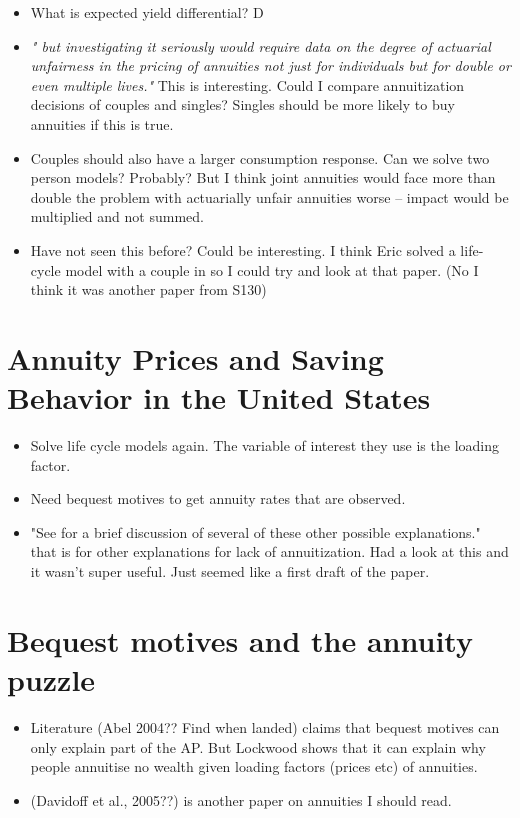 \documentclass[12pt]{article}
\begin{document}
\begin{itemize}
      \item What is expected yield differential? D
      \item \textit{" but investigating it seriously would require data on the
                  degree of actuarial unfairness in the pricing of annuities not just for
                  individuals but for double or even multiple lives."} This is interesting.
            Could I compare annuitization decisions of couples and singles? Singles
            should be more likely to buy annuities if this is true.

      \item Couples should also have a larger consumption response. Can we solve
            two person models? Probably? But I think joint annuities would face
            more than double the problem with actuarially unfair annuities worse --
            impact would be multiplied and not summed.

      \item Have not seen this before? Could be interesting. I think Eric solved a life-cycle model
            with a couple in so I could try and look at that paper. (No I think it was another paper from S130)

\end{itemize}

\section{Annuity Prices and Saving Behavior in the United States}
\begin{itemize}
      \item Solve life cycle models again. The variable of interest they use is the
            loading factor.

      \item Need bequest motives to get annuity rates that are observed.
      \item "See \cite{friedman_warshawsky_nber_1985} for a brief discussion of several
            of these other possible explanations." that is for other explanations for
            lack of annuitization. Had a look at this and it wasn't super useful. Just
            seemed like a first draft of the paper.



\end{itemize}


\section{Bequest motives and the annuity puzzle}
\begin{itemize}
      \item Literature (Abel 2004?? Find when landed) claims that bequest motives
            can only explain part of the AP. But Lockwood shows that it can explain why people
            annuitise no wealth given loading factors (prices etc) of annuities.

      \item  (Davidoff et al., 2005??) is another paper on annuities I should read.


\end{itemize}
\end{document}
